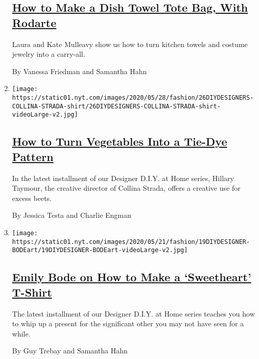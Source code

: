 \begin{enumerate}
  \hypertarget{how-to-make-a-dish-towel-tote-bag-with-rodarte}{%
  \subsection{\texorpdfstring{\href{/2020/06/02/style/dish-towel-tote-bag.html}{How
  to Make a Dish Towel Tote Bag, With
  Rodarte}}{How to Make a Dish Towel Tote Bag, With Rodarte}}\label{how-to-make-a-dish-towel-tote-bag-with-rodarte}}

  Laura and Kate Mulleavy show us how to turn kitchen towels and costume
  jewelry into a carry-all.

  By Vanessa Friedman and Samantha Hahn
\item
  \texttt{[image: https://static01.nyt.com/images/2020/05/28/fashion/26DIYDESIGNERS-COLLINA-STRADA-shirt/26DIYDESIGNERS-COLLINA-STRADA-shirt-videoLarge-v2.jpg]}

  \hypertarget{how-to-turn-vegetables-into-a-tie-dye-pattern}{%
  \subsection{\texorpdfstring{\href{/2020/05/27/style/tie-dye-plaid-with-collina-strada.html}{How
  to Turn Vegetables Into a Tie-Dye
  Pattern}}{How to Turn Vegetables Into a Tie-Dye Pattern}}\label{how-to-turn-vegetables-into-a-tie-dye-pattern}}

  In the latest installment of our Designer D.I.Y. at Home series,
  Hillary Taymour, the creative director of Collina Strada, offers a
  creative use for excess beets.

  By Jessica Testa and Charlie Engman
\item
  \texttt{[image: https://static01.nyt.com/images/2020/05/21/fashion/19DIYDESIGNER-BODEart/19DIYDESIGNER-BODEart-videoLarge-v2.jpg]}

  \hypertarget{emily-bode-on-how-to-make-a-sweetheart-t-shirt}{%
  \subsection{\texorpdfstring{\href{/2020/05/19/style/emily-bode-sweetheart-t-shirt.html}{Emily
  Bode on How to Make a `Sweetheart'
  T-Shirt}}{Emily Bode on How to Make a `Sweetheart' T-Shirt}}\label{emily-bode-on-how-to-make-a-sweetheart-t-shirt}}

  The latest installment of our Designer D.I.Y. at Home series teaches
  you how to whip up a present for the significant other you may not
  have seen for a while.

  By Guy Trebay and Samantha Hahn
\end{enumerate}

